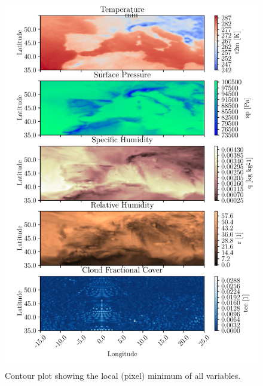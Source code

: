 \begin{figure}[ht]
    \centering
    \includegraphics{python_figs/contourplot_all_variables_min.pdf}
    \caption{Contour plot showing the local (pixel) minimum of all variables.}
    \label{fig:contour_min_all_vars}
\end{figure}


